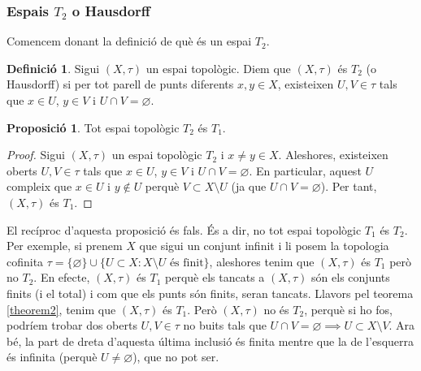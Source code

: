 \documentclass[10pt,a4paper]{article}
\theoremstyle{definition}
\newtheorem{definition}[theorem]{Definició}
\newtheorem{prop}[theorem]{Proposició}
\begin{document}
\subsubsection*{Espais $T_2$ o Hausdorff}
Comencem donant la definició de què és un espai $T_2$.
\begin{definition}
      Sigui $(X,\tau)$ un espai topològic. Diem que $(X,\tau)$ és $T_2$ (o Hausdorff) si per tot parell de punts diferents $x,y\in X$, existeixen $U,V\in\tau$ tals que $x\in U$, $y\in V$ i $U\cap V=\varnothing$.
\end{definition}
\begin{prop}
      Tot espai topològic $T_2$ és $T_1$.
\end{prop}
\begin{proof}
      Sigui $(X,\tau)$ un espai topològic $T_2$ i $x\ne y\in X$. Aleshores, existeixen oberts $U,V\in\tau$ tals que $x\in U$, $y\in V$ i $U\cap V=\varnothing$. En particular, aquest $U$ compleix que $x\in U$ i $y\notin U$ perquè $V\subset X\setminus U$ (ja que $U\cap V=\varnothing$). Per tant, $(X,\tau)$ és $T_1$.
\end{proof}
El recíproc d'aquesta proposició és fals. És a dir, no tot espai topològic $T_1$ és $T_2$. Per exemple, si prenem $X$ que sigui un conjunt infinit i li posem la topologia cofinita $\tau=\{\varnothing\}\cup\{U\subset X:X\setminus U\text{ és finit}\}$, aleshores tenim que $(X,\tau)$ és $T_1$ però no $T_2$. En efecte, $(X,\tau)$ és $T_1$ perquè els tancats a $(X,\tau)$ són els conjunts finits (i el total) i com que els punts són finits, seran tancats. Llavors pel teorema \ref{theorem2}, tenim que $(X,\tau)$ és $T_1$. Però $(X,\tau)$ no és $T_2$, perquè si ho fos, podríem trobar dos oberts $U,V\in\tau$ no buits tals que $U\cap V=\varnothing\implies U\subset X\setminus V$. Ara bé, la part de dreta d'aquesta última inclusió és finita mentre que la de l'esquerra és infinita (perquè $U\ne\varnothing$), que no pot ser.
\end{document}
